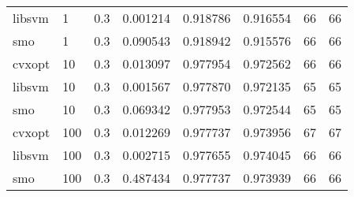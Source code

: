 \begin{tabular}{lllrrrrr}
libsvm &   1 &     0.3 &  0.001214 &  0.918786 & 0.916554 &           66 &         66 \\
   smo &   1 &     0.3 &  0.090543 &  0.918942 & 0.915576 &           66 &         66 \\
cvxopt &  10 &     0.3 &  0.013097 &  0.977954 & 0.972562 &           66 &         66 \\
libsvm &  10 &     0.3 &  0.001567 &  0.977870 & 0.972135 &           65 &         65 \\
   smo &  10 &     0.3 &  0.069342 &  0.977953 & 0.972544 &           65 &         65 \\
cvxopt & 100 &     0.3 &  0.012269 &  0.977737 & 0.973956 &           67 &         67 \\
libsvm & 100 &     0.3 &  0.002715 &  0.977655 & 0.974045 &           66 &         66 \\
   smo & 100 &     0.3 &  0.487434 &  0.977737 & 0.973939 &           66 &         66 \\
\bottomrule
\end{tabular}
